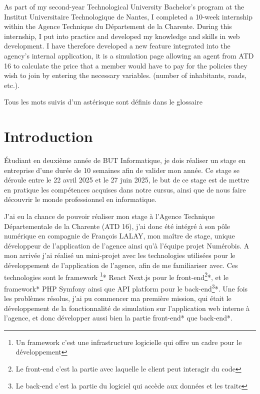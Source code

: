 \documentclass[a4paper,12pt]{report}
\begin{document}
\vspace{1em}

As part of my second-year Technological University Bachelor’s program at the Institut Universitaire Technologique de Nantes, I completed a 10-week internship within the Agence Technique du Département de la Charente. During this internship, I put into practice and developed my knowledge and skills in web development. I have therefore developed a new feature integrated into the agency’s internal application, it is a simulation page allowing an agent from ATD 16 to calculate the price that a member would have to pay for the policies they wish to join by entering the necessary variables. (number of inhabitants, roads, etc.).

\tableofcontents               

\newpage
\thispagestyle{empty}
\vspace*{\fill}            
\begin{center}             
Tous les mots suivis d'un astérisque sont définis dans le glossaire
\end{center}
\vspace*{\fill}            


\chapter{Introduction}         
Étudiant en deuxième année de BUT Informatique, je dois réaliser un stage en entreprise d'une durée de 10 semaines afin de valider mon année. Ce stage se déroule entre le 22 avril 2025 et le 27 juin 2025, le but de ce stage est de mettre en pratique les compétences acquises dans notre cursus, ainsi que de nous faire découvrir le monde professionnel en informatique.

\vspace{1em}

J'ai eu la chance de pouvoir réaliser mon stage à l'Agence Technique Départementale de la Charente (ATD 16), j'ai donc été intégré à son pôle numérique en compagnie de François LALAY, mon maître de stage, unique développeur de l'application de l'agence ainsi qu'à l'équipe projet Numérobis. A mon arrivée j'ai réalisé un mini-projet avec les technologies utilisées pour le développement de l'application de l'agence, afin de me familiariser avec. Ces technologies sont le framework \footnote{Un framework c'est une infrastructure logicielle qui offre un cadre pour le développement}* React Next.js pour le front-end\footnote{Le front-end c'est la partie avec laquelle le client peut interagir du code}*, et le framework* PHP Symfony ainsi que API platform pour le back-end\footnote{Le back-end c'est la partie du logiciel qui accède aux données et les traite}*. Une fois les problèmes résolus, j'ai pu commencer ma première mission, qui était le développement de la fonctionnalité de simulation sur l'application web interne à l'agence, et donc développer aussi bien la partie front-end* que back-end*.
\end{document}
